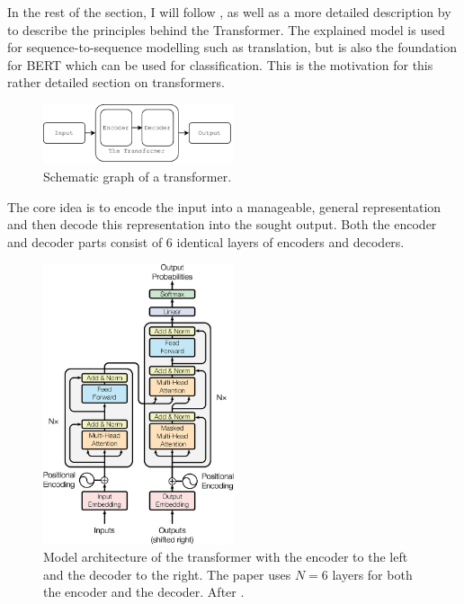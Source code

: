 In the rest of the section, I will follow \citet{NIPS2017_7181}, as well as a more detailed description by \citet{jayalammar2018} to describe the principles behind the Transformer. The explained model is used for sequence-to-sequence modelling such as translation, but is also the foundation for BERT which can be used for classification. This is the motivation for this rather detailed section on transformers. 

\begin{figure}[ht]
    \centering
    \includegraphics[width=0.5\textwidth]{Figures/figs-transformer.pdf}
    \caption{Schematic graph of a transformer.}
    \label{fig:trfo}
\end{figure}

The core idea is to encode the input into a manageable, general representation and then decode this representation into the sought output. Both the encoder and decoder parts consist of 6 identical layers of encoders and decoders.

\begin{figure}[ht]
    \centering
    \includegraphics[width=0.5\textwidth]{Figures/The-Transformer-model-architecture.png}
    \caption{Model architecture of the transformer with the encoder to the left and the decoder to the right. The paper uses $N = 6$ layers for both the encoder and the decoder. After \citet{NIPS2017_7181}.}
    \label{fig:tr_arch}
\end{figure}


